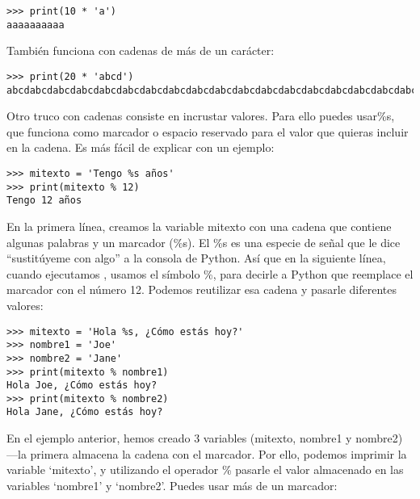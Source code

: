 \begin{listing}
\begin{verbatim}
>>> print(10 * 'a')
aaaaaaaaaa
\end{verbatim}
\end{listing}

También funciona con cadenas de más de un carácter:

\begin{listing}
\begin{verbatim}
>>> print(20 * 'abcd')
abcdabcdabcdabcdabcdabcdabcdabcdabcdabcdabcdabcdabcdabcdabcdabcdabcdabcdabcdabcd
\end{verbatim}
\end{listing}

Otro truco con cadenas consiste en incrustar valores.  Para ello puedes usar\%s, que funciona como marcador o espacio reservado para el valor que quieras incluir en la cadena. Es más fácil de explicar con un ejemplo:

\begin{listing}
\begin{verbatim}
>>> mitexto = 'Tengo %s años'
>>> print(mitexto % 12)
Tengo 12 años
\end{verbatim}
\end{listing}

En la primera línea, creamos la variable mitexto con una cadena que contiene algunas palabras y un marcador (\%s). El \%s es una especie de señal que le dice ``sustitúyeme con algo'' a la consola de Python. Así que en la siguiente línea, cuando ejecutamos , usamos el símbolo \%, para decirle a Python que reemplace el marcador con el número 12. Podemos reutilizar esa cadena y pasarle diferentes valores:

\begin{listing}
\begin{verbatim}
>>> mitexto = 'Hola %s, ¿Cómo estás hoy?'
>>> nombre1 = 'Joe'
>>> nombre2 = 'Jane'
>>> print(mitexto % nombre1)
Hola Joe, ¿Cómo estás hoy?
>>> print(mitexto % nombre2)
Hola Jane, ¿Cómo estás hoy?
\end{verbatim}
\end{listing}

En el ejemplo anterior, hemos creado 3 variables (mitexto, nombre1 y nombre2)---la primera almacena la cadena con el marcador. Por ello, podemos imprimir la variable `mitexto', y utilizando el operador \% pasarle el valor almacenado en las variables `nombre1' y `nombre2'.  Puedes usar más de un marcador:

